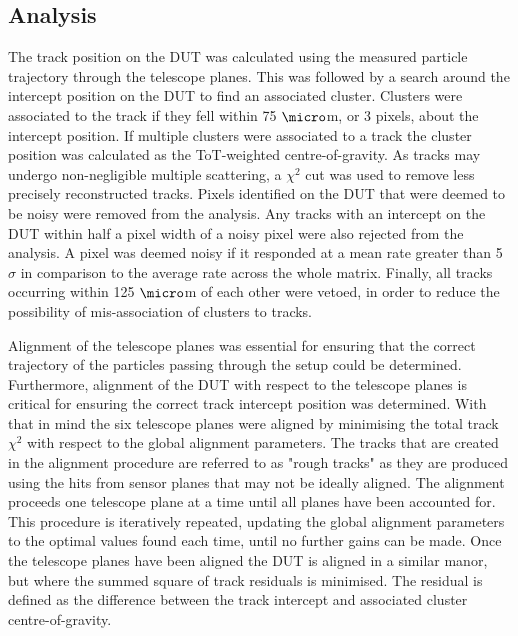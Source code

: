 
\subsection{Analysis}
The track position on the DUT was calculated using the measured particle trajectory through the telescope planes.  This was followed by a search around the intercept position on the DUT to find an associated cluster.  Clusters were associated to the track if they fell within 75 $\micro$m, or 3 pixels, about the intercept position.  If multiple clusters were associated to a track the cluster position was calculated as the ToT-weighted centre-of-gravity.  As tracks may undergo non-negligible multiple scattering, a $\chi^{2}$ cut was used to remove less precisely reconstructed tracks.  Pixels identified on the DUT that were deemed to be noisy were removed from the analysis.  Any tracks with an intercept on the DUT within half a pixel width of a noisy pixel were also rejected from the analysis.  A pixel was deemed noisy if it responded at a mean rate greater than 5 $\sigma$ in comparison to the average rate across the whole matrix.  Finally, all tracks occurring within 125 $\micro$m of each other were vetoed, in order to reduce the possibility of mis-association of clusters to tracks. 

Alignment of the telescope planes was essential for ensuring that the correct trajectory of the particles passing through the setup could be determined.  Furthermore, alignment of the DUT with respect to the telescope planes is critical for ensuring the correct track intercept position was determined.  With that in mind the six telescope planes were aligned by minimising the total track $\chi^{2}$ with respect to the global alignment parameters.  The tracks that are created in the alignment procedure are referred to as "rough tracks" as they are produced using the hits from sensor planes that may not be ideally aligned.  The alignment proceeds one telescope plane at a time until all planes have been accounted for.  This procedure is iteratively repeated, updating the global alignment parameters to the optimal values found each time, until no further gains can be made.  Once the telescope planes have been aligned the DUT is aligned in a similar manor, but where the summed square of track residuals is minimised.  The residual is defined as the difference between the track intercept and associated cluster centre-of-gravity.  

